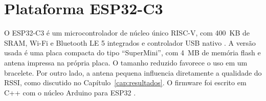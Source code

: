 \section{Plataforma ESP32-C3}
\label{sec:esp32c3}

O ESP32-C3 é um microcontrolador de núcleo único RISC-V, com 400~KB de SRAM, Wi-Fi e Bluetooth LE 5 integrados e controlador USB nativo \cite{espressif2024esp32c3}. A versão usada é uma placa compacta do tipo ``SuperMini'', com 4~MB de memória flash e antena impressa na própria placa. O tamanho reduzido favorece o uso em um bracelete. Por outro lado, a antena pequena influencia diretamente a qualidade do RSSI, como discutido no Capítulo~\ref{cap:resultados}. O firmware foi escrito em C++ com o núcleo Arduino para ESP32 \cite{espressif2026arduino}.
